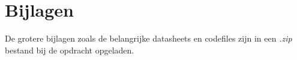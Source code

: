 \documentclass[dutch,thesis, cbt]{odiseereport}
\renewcommand{\cleardoublepage}{\clearpage}
\begin{document}





%
%


%

\setlength\bibitemsep{2pt} %
\printbibliography[heading=bibintoc]



%

\appendix
{}
\chapter{Bijlagen}

De grotere bijlagen zoals de belangrijke datasheets en codefiles zijn in een \textit{.zip} bestand bij de opdracht opgeladen.

\cleardoublepage
{}
\label{bijlage:ControllerboardSchematic}


\cleardoublepage
{}
\label{bijlage:ExpansionboardSchematic}


\cleardoublepage
{}
\label{bijlage:IOboardSchematic}

\end{document}
